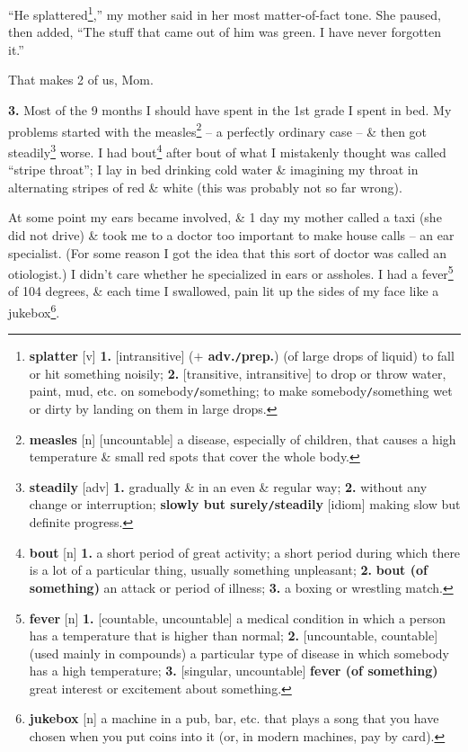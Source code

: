 \documentclass[oneside]{book}
\numberwithin{equation}{section}
\begin{document}
``He splattered\footnote{\textbf{splatter} [v] \textbf{1.} [intransitive] (\textbf{$+$ adv.\texttt{/}prep.}) (of large drops of liquid) to fall or hit something noisily; \textbf{2.} [transitive, intransitive] to drop or throw water, paint, mud, etc. on somebody\texttt{/}something; to make somebody\texttt{/}something wet or dirty by landing on them in large drops.},'' my mother said in her most matter-of-fact tone. She paused, then added, ``The stuff that came out of him was green. I have never forgotten it.''

That makes 2 of us, Mom.

\textbf{3.} Most of the 9 months I should have spent in the 1st grade I spent in bed. My problems started with the measles\footnote{\textbf{measles} [n] [uncountable] a disease, especially of children, that causes a high temperature \& small red spots that cover the whole body.} -- a perfectly ordinary case -- \& then got steadily\footnote{\textbf{steadily} [adv] \textbf{1.} gradually \& in an even \& regular way; \textbf{2.} without any change or interruption; \textbf{slowly but surely\texttt{/}steadily} [idiom] making slow but definite progress.} worse. I had bout\footnote{\textbf{bout} [n] \textbf{1.} a short period of great activity; a short period during which there is a lot of a particular thing, usually something unpleasant; \textbf{2.} \textbf{bout (of something)} an attack or period of illness; \textbf{3.} a boxing or wrestling match.} after bout of what I mistakenly thought was called ``stripe throat''; I lay in bed drinking cold water \& imagining my throat in alternating stripes of red \& white (this was probably not so far wrong).

At some point my ears became involved, \& 1 day my mother called a taxi (she did not drive) \& took me to a doctor too important to make house calls -- an ear specialist. (For some reason I got the idea that this sort of doctor was called an otiologist.) I didn't care whether he specialized in ears or assholes. I had a fever\footnote{\textbf{fever} [n] \textbf{1.} [countable, uncountable] a medical condition in which a person has a temperature that is higher than normal; \textbf{2.} [uncountable, countable] (used mainly in compounds) a particular type of disease in which somebody has a high temperature; \textbf{3.} [singular, uncountable] \textbf{fever (of something)} great interest or excitement about something.} of 104 degrees, \& each time I swallowed, pain lit up the sides of my face like a jukebox\footnote{\textbf{jukebox} [n] a machine in a pub, bar, etc. that plays a song that you have chosen when you put coins into it (or, in modern machines, pay by card).}.
\end{document}
